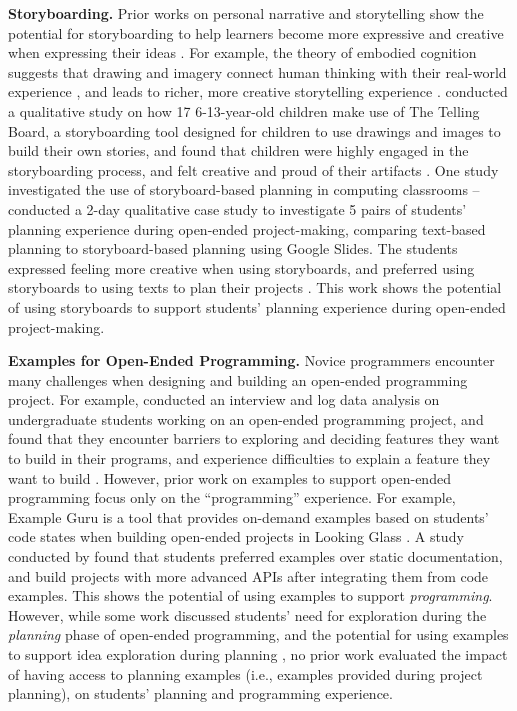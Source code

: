 \textbf{Storyboarding.} Prior works on personal narrative and storytelling show the potential for storyboarding to help learners become more expressive and creative when expressing their ideas \cite{powell2018telling}. For example, the theory of embodied cognition \cite{wilson2002six} suggests that drawing and imagery connect human thinking with their real-world experience \cite{mcneill2008gesture}, and leads to richer, more creative storytelling experience \cite{powell2018telling, chu2014effects, valguarnera2021eppics}.
\citeauthor{powell2018telling} conducted a qualitative study on how 17 6-13-year-old children make use of The Telling Board, a storyboarding tool designed for children to use drawings and images to build their own stories, and found that children were highly engaged in the storyboarding process, and felt creative and proud of their artifacts \cite{powell2018telling}. 
One study investigated the use of storyboard-based planning in computing classrooms -- \citeauthor{limke2022case} conducted a 2-day qualitative case study to investigate 5 pairs of students' planning experience during open-ended project-making, comparing text-based planning to storyboard-based planning using Google Slides. The students expressed feeling more creative when using storyboards, and preferred using storyboards to using texts to plan their projects \cite{limke2022case}. This work shows the potential of using storyboards to support students' planning experience during open-ended project-making. 




\textbf{Examples for Open-Ended Programming.} Novice programmers encounter many challenges when designing and building an open-ended programming project. For example, \citeauthor{wang2021novices} conducted an interview and log data analysis on undergraduate students working on an open-ended programming project, and found that they encounter barriers to exploring and deciding features they want to build in their programs, and experience difficulties to explain a feature they want to build \cite{wang2021novices}. However, prior work on examples to support open-ended programming focus only on the ``programming'' experience. For example, Example Guru is a tool that provides on-demand examples based on students' code states when building open-ended projects in Looking Glass \cite{ichinco2017suggesting}. A study conducted by \citeauthor{ichinco2017suggesting} found that students preferred examples over static documentation, and build projects with more advanced APIs after integrating them from code examples. This shows the potential of using examples to support \textit{programming}. However, while some work discussed students' need for exploration during the \textit{planning} phase of open-ended programming, and the potential for using examples to support idea exploration during planning \cite{limke2022case}, no prior work evaluated the impact of having access to planning examples (i.e., examples provided during project planning), on students' planning and programming experience. 

